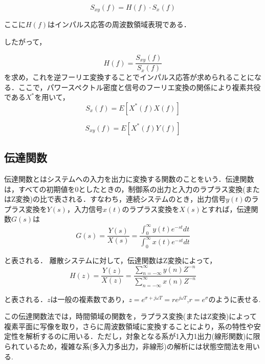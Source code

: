 \documentclass[a4j,11pt]{jsarticle}
\begin{document}
{\Large
\begin{equation}
\label{crossspec1}
  S_{xy}(f) = H(f)\cdot S_x(f)
\end{equation}
}

ここに$H(f)$はインパルス応答の周波数領域表現である．

したがって，

{\Large
\begin{equation}
\label{crossspec2}
  H(f) = \frac {S_{xy}(f)}{S_x(f)}
\end{equation}
}
を求め，これを逆フーリエ変換することでインパルス応答が求められることになる．ここで，パワースペクトル密度と信号のフーリエ変換の関係により複素共役である$X^{*}$を用いて，
{\Large
\begin{equation}
\label{crossspec3}
  S_{x}(f) = E[X^{*}(f)X(f)]
\end{equation}
}

{\Large
\begin{equation}
\label{crossspec4}
  S_{xy}(f) = E[X^{*}(f)Y(f)]
\end{equation}
}
\subsection{伝達関数}
伝達関数とはシステムへの入力を出力に変換する関数のことをいう．伝達関数は，すべての初期値を0としたときの，制御系の出力と入力のラプラス変換(またはZ変換)の比で表される．すなわち，連続システムのとき，出力信号$y(t)$のラプラス変換を$Y(s)$，入力信号$x(t)$のラプラス変換を$X(s)$とすれば，伝達関数$G(s)$は
{\Large
\begin{equation}
	\label{noref}
  G(s) =  \frac{Y(s)}{X(s)} = \frac{{\int^{\infty}_0}y(t)e^{-st}{dt}}{{\int^{\infty}_0}x(t)e^{-st}{dt}}
\end{equation}
}


と表される．
離散システムに対して，伝達関数はZ変換によって，
{\Large
\begin{equation}
	\label{noref}
  H(z) =   \frac{Y(z)}{X(z)} = \frac{{\sum^{\infty}_{n = -\infty}}y(n)Z^{-n}}{{\sum^{\infty}_{n = -\infty}}x(n)Z^{-n}}
\end{equation}
}


と表される．$z$は一般の複素数であり，$z=e^{\sigma +j\omega T} =re^{j\omega T}$,$r=e^{\sigma}$のように表せる.

この伝達関数法では，時間領域の関数を，ラプラス変換(またはZ変換)によって複素平面に写像を取り，さらに周波数領域に変換することにより，系の特性や安定性を解析するのに用いる．ただし，対象となる系が1入力1出力(線形関数)に限られているため，複雑な系(多入力多出力，非線形)の解析には状態空間法を用いる.
\end{document}
